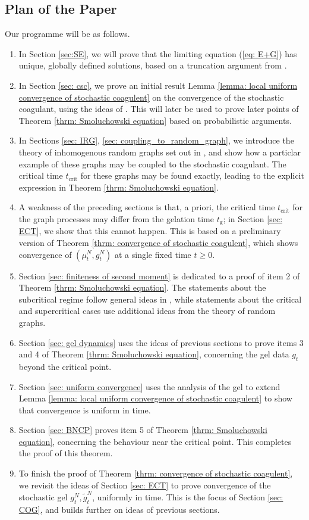 \subsection{Plan of the Paper} Our programme will be as follows. \begin{enumerate} \item In Section \ref{sec:SE}, we will prove that the limiting equation (\ref{eq: E+G}) has unique, globally defined solutions, based on a truncation argument from \cite{N99,N00}.
\item In Section \ref{sec: csc}, we prove an initial result Lemma \ref{lemma: local uniform convergence of stochastic coagulent} on the convergence of the stochastic coagulant, using the ideas of \cite[Theorem 4.1]{N00}. This will later be used to prove later points of Theorem \ref{thrm: Smoluchowski equation} based on probabilistic arguments.
\item In Sections \ref{sec: IRG}, \ref{sec: coupling_to_random_graph}, we introduce the theory of inhomogenous random graphs set out in \cite{BJR07}, and show how a particlar example of these graphs may be coupled to the stochastic coagulant. The critical time $t_\mathrm{crit}$ for these graphs may be found exactly, leading to the explicit expression in Theorem \ref{thrm: Smoluchowski equation}. \item A weakness of the preceding sections is that, a priori, the critical time $t_\mathrm{crit}$ for the graph processes may differ from the gelation time $t_\mathrm{g}$; in Section \ref{sec: ECT}, we show that this cannot happen. This is based on a preliminary version of Theorem \ref{thrm: convergence of stochastic coagulent}, which shows convergence of $(\mu^N_t, g^N_t)$ at a single fixed time $t\ge 0$. 
\item Section \ref{sec: finiteness of second moment} is dedicated to a proof of item 2 of Theorem \ref{thrm: Smoluchowski equation}. The statements about the subcritical regime follow general ideas in \cite{N99,N00}, while statements about the critical and supercritical cases use additional ideas from the theory of random graphs.
\item Section \ref{sec: gel dynamics} uses the ideas of previous sections to prove items 3 and 4 of Theorem \ref{thrm: Smoluchowski equation}, concerning the gel data $g_t$ beyond the critical point. \item Section \ref{sec: uniform convergence} uses the analysis of the gel to extend Lemma \ref{lemma: local uniform convergence of stochastic coagulent} to show that convergence is uniform in time.
\item Section \ref{sec: BNCP} proves item 5 of Theorem \ref{thrm: Smoluchowski equation}, concerning the behaviour near the critical point. This completes the proof of this theorem. \item To finish the proof of Theorem \ref{thrm: convergence of stochastic coagulent}, we revisit the ideas of Section \ref{sec: ECT} to prove convergence of the stochastic gel $g^N_t, \widetilde{g}^N_t$, uniformly in time. This is the focus of Section \ref{sec: COG}, and builds further on ideas of previous sections. \end{enumerate}